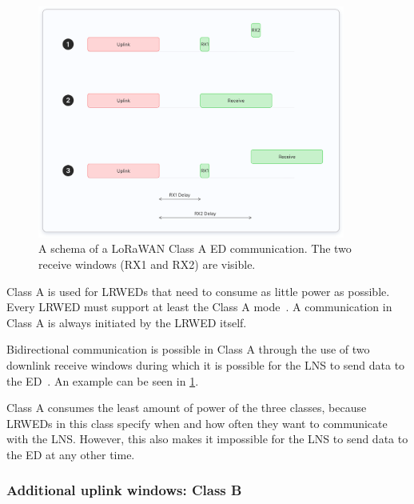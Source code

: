 \begin{figure}[htbp]
    \centering
    \includegraphics[width=0.9\textwidth]{pictures/device-classes/class-a.png}
    \caption{
        A schema of a \ac{LoRaWAN} Class A \acl{ED} communication.
        The two receive windows (RX1 and RX2) are visible.~\protect\cite{the_things_industries_bv_device_nodate}
    }\label{pic:lorawan-device-class-a-schema}
\end{figure}

Class A is used for \aclp{LRWED} that need to consume as little power as possible.
Every \acl{LRWED} must support at least the Class A mode~\cite[p. 11]{lora_alliance_inc_lorawan_specification_2017}.
A communication in Class A is always initiated by the \acl{LRWED} itself.

Bidirectional communication is possible in Class A through the use of two downlink receive windows during which it is possible for the \ac{LNS} to send data to the \acl{ED}~\cite[p. 13]{lora_alliance_inc_lorawan_specification_2017}.
An example can be seen in \cref{pic:lorawan-device-class-a-schema}.

Class A consumes the least amount of power of the three classes, because \aclp{LRWED} in this class specify when and how often they want to communicate with the \ac{LNS}.
However, this also makes it impossible for the \ac{LNS} to send data to the \acl{ED} at any other time.

\subsubsection{Additional uplink windows: Class B}

